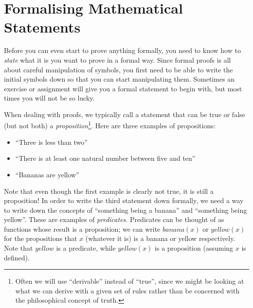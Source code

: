 \documentclass{tufte-handout}
\newcounter{example}
\begin{document}
\section{Formalising Mathematical Statements}


Before you can even start to prove anything formally, you need to
know how to \emph{state} what it is you want to prove in a formal
way. Since formal proofs is all about careful manipulation of
symbols, you first need to be able to write the initial symbols
down so that you can start manipulating them. Sometimes an
exercise or assignment will give you a formal statement to begin
with, but most times you will not be so lucky.

When dealing with proofs, we typically call a statement that can
be true or false (but not both) a
\emph{proposition}\footnote{Often we will use ``derivable''
  instead of ``true'', since we might be looking at what we can
  derive with a given set of rules rather than be concerned with
  the philosophical concept of truth. }. Here are three examples
of propositions:
\begin{itemize}
\item ``Three is less than two''
\item ``There is at least one natural number between five
and ten''
\item ``Bananas are yellow''
\end{itemize}

\noindent
Note that even though the first example is clearly not true, it is
still a proposition!
%
In order to write the third statement down formally, we need a way
to write down the concepts of ``something being a banana'' and
``something being yellow''. These are examples of
\emph{predicates}. Predicates can be thought of as functions whose
result is a proposition; we can write $\mathit{banana}(x)$ or
$\mathit{yellow}(x)$ for the propositions that $x$ (whatever it
is) is a banana or yellow respectively. Note that
$\mathit{yellow}$ is a predicate, while $\mathit{yellow}(x)$ is a
proposition (assuming $x$ is defined).

\end{document}
